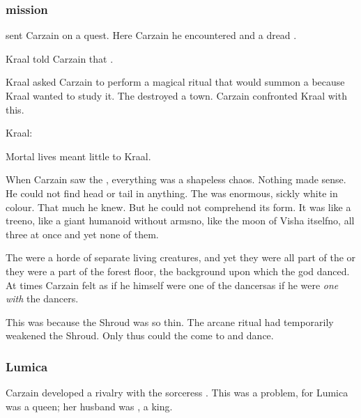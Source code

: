 \subsubsection{\Moongod mission}
\ZeethanKraal sent Carzain on a quest.
Here Carzain he encountered  and a dread . 

Kraal told Carzain that . 

Kraal asked Carzain to perform a magical ritual that would summon a \moongod because Kraal wanted to study it.
The \moongod destroyed a town.
Carzain confronted Kraal with this. 

\begin{prose}
  Kraal: 
\end{prose}

Mortal lives meant little to Kraal.

When Carzain saw the \moongod, everything was a shapeless chaos.
Nothing made sense.
He could not find head or tail in anything. 
The \moongod was enormous, sickly white in colour. 
That much he knew.
But he could not comprehend its form. 
It was like a tree\dash no, like a giant humanoid without arms\dash no, like the moon of Visha itself\dash no, all three at once and yet none of them. 

The \glithids were a horde of separate living creatures, and yet they were all part of the \moongod\dash or they were a part of the forest floor, the background upon which the god danced. 
At times Carzain felt as if he himself were one of the dancers\dash as if he were \emph{one with} the dancers. 

This was because the Shroud was so thin.
The arcane ritual had temporarily weakened the Shroud. 
Only thus could the \moongod come to \Miith and dance.






\subsubsection{Lumica}
Carzain developed a rivalry with the sorceress .
This was a problem, for Lumica was a queen; her husband was , a king. 


